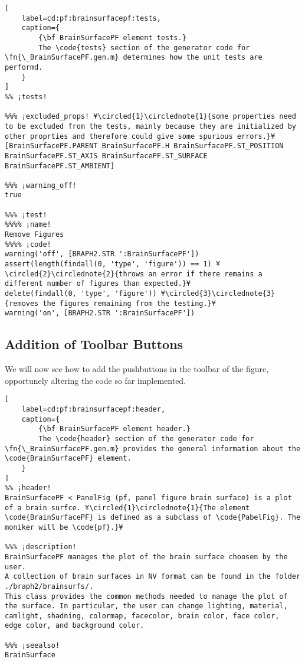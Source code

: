 \documentclass{tufte-handout}
\begin{document}
\begin{lstlisting}[
	label=cd:pf:brainsurfacepf:tests,
	caption={
		{\bf BrainSurfacePF element tests.}
		The \code{tests} section of the generator code for \fn{\_BrainSurfacePF.gen.m} determines how the unit tests are performd.
	}
]
%% ¡tests!

%%% ¡excluded_props! ¥\circled{1}\circlednote{1}{some properties need to be excluded from the tests, mainly because they are initialized by other proprties and therefore could give some spurious errors.}¥
[BrainSurfacePF.PARENT BrainSurfacePF.H BrainSurfacePF.ST_POSITION BrainSurfacePF.ST_AXIS BrainSurfacePF.ST_SURFACE BrainSurfacePF.ST_AMBIENT]

%%% ¡warning_off!
true

%%% ¡test!
%%%% ¡name!
Remove Figures
%%%% ¡code!
warning('off', [BRAPH2.STR ':BrainSurfacePF'])
assert(length(findall(0, 'type', 'figure')) == 1) ¥\circled{2}\circlednote{2}{throws an error if there remains a different number of figures than expected.}¥
delete(findall(0, 'type', 'figure')) ¥\circled{3}\circlednote{3}{removes the figures remaining from the testing.}¥
warning('on', [BRAPH2.STR ':BrainSurfacePF'])
\end{lstlisting}

\subsection{Addition of Toolbar Buttons}

We will now see how to add the pushbuttons in the toolbar of the figure, opportunely altering the code so far implemented.

\begin{lstlisting}[
	label=cd:pf:brainsurfacepf:header,
	caption={
		{\bf BrainSurfacePF element header.}
		The \code{header} section of the generator code for \fn{\_BrainSurfacePF.gen.m} provides the general information about the \code{BrainSurfacePF} element.
	}
]
%% ¡header!
BrainSurfacePF < PanelFig (pf, panel figure brain surface) is a plot of a brain surfce. ¥\circled{1}\circlednote{1}{The element \code{BrainSurfacePF} is defined as a subclass of \code{PabelFig}. The moniker will be \code{pf}.}¥

%%% ¡description!
BrainSurfacePF manages the plot of the brain surface choosen by the user. 
A collection of brain surfaces in NV format can be found in the folder 
./braph2/brainsurfs/.
This class provides the common methods needed to manage the plot of 
the surface. In particular, the user can change lighting, material, 
camlight, shadning, colormap, facecolor, brain color, face color, 
edge color, and background color. 

%%% ¡seealso!
BrainSurface
\end{lstlisting}
\end{document}
